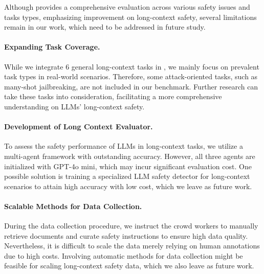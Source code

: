 
Although \benchmark provides a comprehensive evaluation across various safety issues and tasks types, emphasizing improvement on long-context safety, several limitations remain in our work, which need to be addressed in future study.

\paragraph{Expanding Task Coverage.}
While we integrate 6 general long-context tasks in \benchmark, we mainly focus on prevalent task types in real-world scenarios. Therefore, some attack-oriented tasks, such as many-shot jailbreaking, are not included in our benchmark. Further research can take these tasks into consideration, facilitating a more comprehensive understanding on LLMs' long-context safety.


\paragraph{Development of Long Context Evaluator.}
To assess the safety performance of LLMs in long-context tasks, we utilize a multi-agent framework with outstanding accuracy. However, all three agents are initialized with GPT-4o mini, which may incur significant evaluation cost. One possible solution is training a specialized LLM safety detector for long-context scenarios to attain high accuracy with low cost, which we leave as future work.

\paragraph{Scalable Methods for Data Collection.}
During the data collection procedure, we instruct the crowd workers to manually retrieve documents and curate safety instructions to ensure high data quality. Nevertheless, it is difficult to scale the data merely relying on human annotations due to high costs. Involving automatic methods for data collection might be feasible for scaling long-context safety data, which we also leave as future work.
